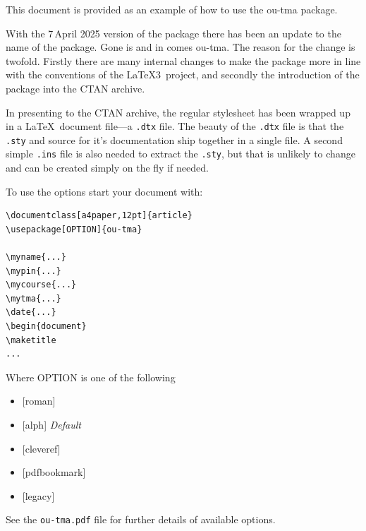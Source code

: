 \documentclass[a4paper,12pt]{article}
\date{16 Nov, 2026} 	%
\begin{document}
\maketitle

\hfill{}

\begin{notebox}[width=\linewidth]

This document is provided as an example of how to use the \textsf{ou-tma} package.

With the 7\nth\,April 2025 version of the package there has been an update to the name of the package. Gone is  and in comes \textsf{ou-tma}. The reason for the change is twofold. Firstly there are many internal changes to make the package more in line with the conventions of the \LaTeX3\ project, and secondly the introduction of the package into the CTAN archive.

In presenting to the CTAN archive, the regular stylesheet has been wrapped up in a \LaTeX\ document file---a \verb|.dtx| file. The beauty of the \verb|.dtx| file is that the \verb|.sty| and source for it's documentation ship together in a single file. A second simple \verb|.ins| file is also needed to extract the \verb|.sty|, but that is unlikely to change and can be created simply on the fly if needed.

To use the options start your document with:
\begin{verbatim}
\documentclass[a4paper,12pt]{article}
\usepackage[OPTION]{ou-tma}

\myname{...}
\mypin{...}
\mycourse{...}
\mytma{...}
\date{...}
\begin{document}
\maketitle
...
\end{verbatim}

Where \textsf{OPTION} is one of the following
\begin{itemize}
  \item {[roman]}
  \item {[alph]} \emph{Default}
  \item {[cleveref]}
  \item {[pdfbookmark]}
  \item {[legacy]}
\end{itemize}

See the \verb|ou-tma.pdf| file for further details of available options.

\end{notebox}
\end{document}
